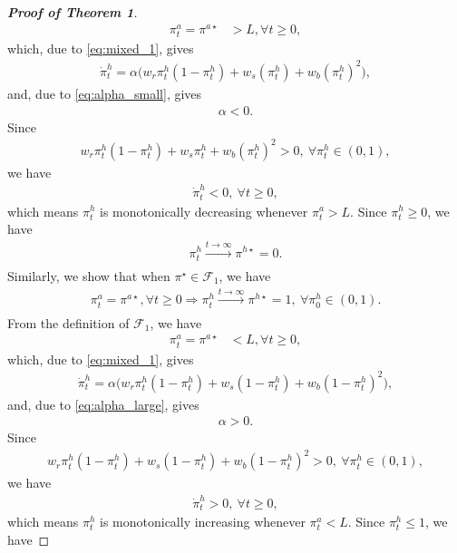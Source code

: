\documentclass[letterpaper]{article} %
\begin{document}
\begin{proof}[\textbf{Proof of Theorem 1}]
\begin{align}
    \pi^a_t = \pi^{a \star}&>L, \forall t\geq 0,\label{eq:thm1_temp_1}
\end{align}
which, due to \eqref{eq:mixed_1}, gives
\begin{align}
    \dot{\pi}^h_t=\alpha \bigg(w_r \pi^h_t(1-\pi^h_t) + w_s (\pi^h_t) + w_b (\pi^h_t)^2  \bigg),
\end{align}
and, due to \eqref{eq:alpha_small}, gives
\begin{align}
    \alpha<0.
\end{align}
Since
\begin{align}
    w_r \pi^h_t(1-\pi^h_t) + w_s \pi^h_t + w_b (\pi^h_t)^2>0,\ \forall \pi^h_t\in(0,1),
\end{align}
we have
\begin{align}
    \dot{\pi}^h_t<0,\ \forall t\geq 0,\label{eq:thm1_temp_2}
\end{align}
which means $\pi^h_t$ is monotonically decreasing whenever $\pi^a_t>L$. Since $\pi^h_t\geq 0$, we have
\begin{align}\label{eq:greater_than_L}
    \pi^h_t\xrightarrow[]{t\rightarrow\infty}\pi^{h \star}=0.
\end{align}
Similarly, we show that when $\pi^\star\in\mathcal{F}_1$, we have
\begin{align}
    \pi^a_t=\pi^{a \star}, \forall t\geq 0\Rightarrow\pi^h_t\xrightarrow[]{t\rightarrow\infty}\pi^{h \star} = 1 ,\ \forall \pi^h_0\in(0,1).
\end{align}
From the definition of $\mathcal{F}_1$, we have
\begin{align}
    \pi^a_t = \pi^{a \star}&<L, \forall t\geq 0, \label{eq:thm1_temp_3}
\end{align}
which, due to \eqref{eq:mixed_1}, gives
\begin{align}
    \dot{\pi}^h_t=\alpha \bigg(w_r \pi^h_t(1-\pi^h_t) + w_s (1-\pi^h_t) + w_b (1-\pi^h_t)^2  \bigg),
\end{align}
and, due to \eqref{eq:alpha_large}, gives
\begin{align}
    \alpha>0.
\end{align}
Since
\begin{align}
    w_r \pi^h_t(1-\pi^h_t) + w_s (1-\pi^h_t) + w_b (1-\pi^h_t)^2>0,\ \forall \pi^h_t\in(0,1),
\end{align}
we have
\begin{align}
    \dot{\pi}^h_t>0,\ \forall t\geq 0,\label{eq:thm1_temp_4}
\end{align}
which means $\pi^h_t$ is monotonically increasing whenever $\pi^a_t<L$. Since $\pi^h_t\leq 1$, we have

\end{proof}
\end{document}
